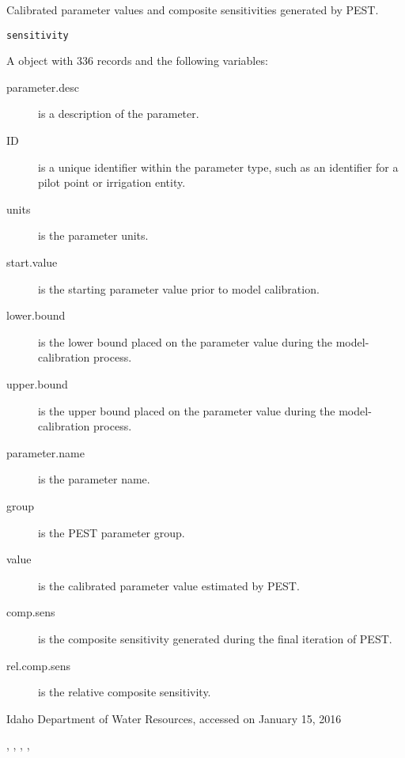 \documentclass[letterpaper]{book}
\begin{document}
%
\begin{Description}\relax
Calibrated parameter values and composite sensitivities generated by PEST.
\end{Description}
%
\begin{Usage}
\begin{verbatim}
sensitivity
\end{verbatim}
\end{Usage}
%
\begin{Format}
A  object with 336 records and the following variables:
\begin{description}

\item[parameter.desc] is a description of the parameter.
\item[ID] is a unique identifier within the parameter type, such as an identifier for a pilot point or irrigation entity.
\item[units] is the parameter units.
\item[start.value] is the starting parameter value prior to model calibration.
\item[lower.bound] is the lower bound placed on the parameter value during the model-calibration process.
\item[upper.bound] is the upper bound placed on the parameter value during the model-calibration process.
\item[parameter.name] is the  parameter name.
\item[group] is the PEST parameter group.
\item[value] is the calibrated parameter value estimated by PEST.
\item[comp.sens] is the composite sensitivity generated during the final iteration of PEST.
\item[rel.comp.sens] is the relative composite sensitivity.

\end{description}

\end{Format}
%
\begin{Source}\relax
Idaho Department of Water Resources, accessed on January 15, 2016
\end{Source}
%
\begin{SeeAlso}\relax
{}, , , , 
\end{SeeAlso}
\end{document}
